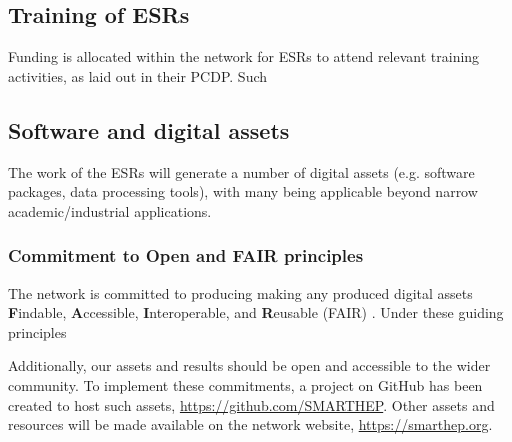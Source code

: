 \subsection{Training of ESRs}
\label{training}
Funding is allocated within the network for ESRs to attend relevant training activities, as laid out in their PCDP. Such 

\subsection{Software and digital assets}
\label{software}
The work of the ESRs will generate a number of digital assets (e.g. software packages, data processing tools), with many being applicable beyond narrow academic/industrial applications. 

\subsubsection{Commitment to Open and FAIR principles}
\label{open-FAIR}
The network is committed to producing making any produced digital assets \textbf{F}indable, \textbf{A}ccessible, \textbf{I}nteroperable, and \textbf{R}eusable (FAIR) \cite{FAIR-principles}. Under these guiding principles\par
Additionally, our assets and results should be open and accessible to the wider community. To implement these commitments, a project on GitHub has been created to host such assets, \url{https://github.com/SMARTHEP}. Other assets and resources will be made available on the network website, \url{https://smarthep.org}.